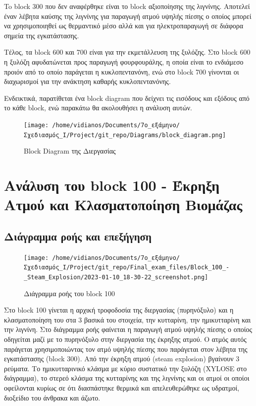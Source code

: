 \documentclass[11pt]{article}
\begin{document}
To block 300 που δεν αναφέρθηκε είναι το block αξιοποίησης της λιγνίνης. Αποτελεί έναν λέβητα καύσης της λιγνίνης για παραγωγή ατμού υψηλής πίεσης ο οποίος μπορεί να χρησιμοποιηθεί ως θερμαντικό μέσο αλλά και για ηλεκτροπαραγωγή σε διάφορα σημεία της εγκατάστασης.

Τέλος, τα block 600 και 700 είναι για την εκμετάλλευση της ξυλόζης. Στο block 600 η ξυλόζη αφυδατώνεται προς παραγωγή φουρφουράλης, η οποία είναι το ενδιάμεσο προιόν από το οποίο παράγεται η κυκλοπεντανόνη, ενώ στο block 700 γίνονται οι διαχωρισμοί για την ανάκτηση καθαρής κυκλοπεντανόνης.

Ενδεικτικά, παρατίθεται ένα block diagram που δείχνει τις εισόδους και εξόδους από το κάθε block, ενώ παρακάτω θα ακολουθήσει η ανάλυση αυτών.

\begin{figure}[htbp]
\centering
\texttt{[image: /home/vidianos/Documents/7o\_εξάμηνο/Σχεδιασμός\_Ι/Project/git\_repo/Diagrams/block\_diagram.png]}
\caption{Block Diagram της Διεργασίας}
\end{figure}

\section{Ανάλυση του block 100 - Έκρηξη Ατμού και Κλασματοποίηση Βιομάζας}
\label{sec:orgf27b46d}

\subsection{Διάγραμμα ροής και επεξήγηση}
\label{sec:org7710339}
\begin{figure}[htbp]
\centering
\texttt{[image: /home/vidianos/Documents/7o\_εξάμηνο/Σχεδιασμός\_Ι/Project/git\_repo/Final\_exam\_files/Block\_100\_-\_Steam\_Explosion/2023-01-10\_18-30-22\_screenshot.png]}
\caption{Διάγραμμα ροής του block 100}
\end{figure}

Στο block 100 γίνεται η αρχική τροφοδοσία της διεργασίας (πυρηνόξυλο) και η κλασματοποίηση του στα 3 βασικά του στοιχεία, την κυτταρίνη, την ημικυτταρίνη και την λιγνίνη. Στο διάγραμμα ροής φαίνεται η παραγωγή ατμού υψηλής πίεσης ο οποίος οδηγείται μαζί με το πυρηνόξυλο στην διεργασία της έκρηξης ατμού. Ο ατμός αυτός παράγεται χρησιμοποιώντας τον ατμό υψηλής πίεσης που παράγεται στον λέβητα της εγκατάστασης (block 300). Από την έκρηξη ατμού (steam explosion) βγαίνουν 3 ρεύματα. Το ημικυτταρινικό κλάσμα με κύριο συστατικό την ξυλόζη (XYLOSE στο διάγραμμα), το στερεό κλάσμα της κυτταρίνης και της λιγνίνης και οι ατμοί οι οποίοι οφείλονται κυρίως σε ότι διασπάστηκε θερμικά και απελευθερώθηκε ως υδρατμοί, διοξείδιο του άνθρακα και άζωτο.
\end{document}
